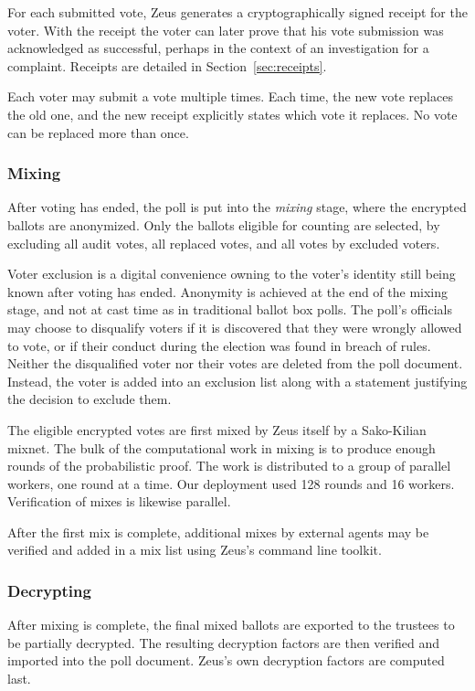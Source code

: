 \documentclass[letterpaper,10pt]{article}
\begin{document}
For each submitted vote, Zeus generates a cryptographically signed
receipt for the voter. With the receipt the voter can later prove that
his vote submission was acknowledged as successful, perhaps in the
context of an investigation for a complaint. Receipts are detailed in
Section~\ref{sec:receipts}.

Each voter may submit a vote multiple times.
Each time, the new vote replaces the old one,
and the new receipt explicitly states which vote it replaces.
No vote can be replaced more than once.

\subsubsection{Mixing}
\label{sec:mixing}
After voting has ended, the poll is put into the \emph{mixing} stage,
where the encrypted ballots are anonymized.
Only the ballots eligible for counting are selected, by excluding
all audit votes, all replaced votes, and all votes by excluded voters.

Voter exclusion is a digital convenience owning to
the voter's identity still being known after voting has ended.
Anonymity is achieved at the end of the mixing stage,
and not at cast time as in traditional ballot box polls.
The poll's officials may choose to disqualify voters if
it is discovered that they were wrongly allowed to vote, or if
their conduct during the election was found in breach of rules.
Neither the disqualified voter nor their votes are deleted from 
the poll document. Instead, the voter is added into an exclusion 
list along with a statement justifying the decision to exclude them.

The eligible encrypted votes are first mixed by Zeus itself
by a Sako-Kilian mixnet.
The bulk of the computational work in mixing is to produce
enough rounds of the probabilistic proof.
The work is distributed to a group of parallel workers,
one round at a time. Our deployment used 128 rounds and 16 workers.
Verification of mixes is likewise parallel.

After the first mix is complete, additional mixes by external agents
may be verified and added in a mix list using Zeus's command line
toolkit. 

\subsubsection{Decrypting}
\label{sec:decrypting}

After mixing is complete, the final mixed ballots are exported to
the trustees to be partially decrypted.
The resulting decryption factors are then verified and imported
into the poll document.
Zeus's own decryption factors are computed last.
\end{document}
